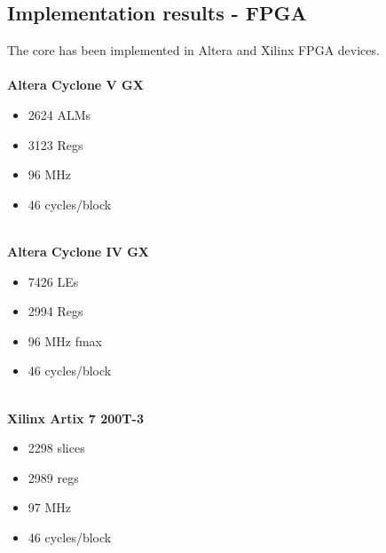 \documentclass[../main.tex]{subfiles}
\begin{document}
\subsection*{Implementation results - FPGA}
The core has been implemented in Altera and Xilinx FPGA devices.\\
\\\textbf{Altera Cyclone V GX}
\begin{itemize}
    \item 2624 ALMs
    \item 3123 Regs
    \item 96 MHz
    \item 46 cycles/block
\end{itemize}

\\\textbf{Altera Cyclone IV GX}
\begin{itemize}
    \item 7426 LEs
    \item 2994 Regs
    \item 96 MHz fmax
    \item 46 cycles/block
\end{itemize}

\\\textbf{Xilinx Artix 7 200T-3}
\begin{itemize}
    \item 2298 slices
    \item 2989 regs
    \item 97 MHz
    \item 46 cycles/block
\end{itemize}
\end{document}
